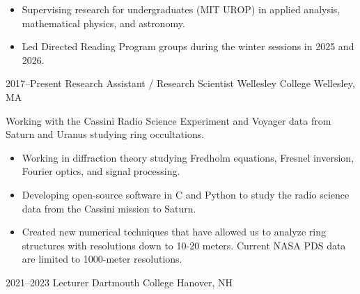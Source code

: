 \documentclass[a4paper,sans]{moderncv}
\begin{document}
{\begin{itemize}
\begin{itemize}
                                    of bifurcation methods.
                                \item
                                    Fast evaluation of the Jones polynomial.
                                \item
                                    Fast evaluation of Khovanov homology.
                            \end{itemize}
                        \item
                            Supervising research for undergraduates
                            (MIT UROP) in applied analysis,
                            mathematical physics, and astronomy.
                        \item
                            Led Directed Reading Program groups during
                            the winter sessions in 2025 and 2026.
                    \end{itemize}
                }
                \cventry%
                {2017--Present}
                {Research Assistant / Research Scientist}
                {Wellesley College}
                {Wellesley, MA}
                {}
                {%
                    Working with the Cassini Radio Science
                    Experiment and Voyager data from Saturn and Uranus
                    studying ring occultations.
                    \begin{itemize}
                        \item
                            Working in diffraction theory studying Fredholm
                            equations, Fresnel inversion, Fourier optics,
                            and signal processing.
                         \item
                            Developing open-source software in C and Python to
                            study the radio science data from the
                            Cassini mission to Saturn.
                         \item
                            Created new numerical techniques that have allowed
                            us to analyze ring structures with resolutions
                            down to 10-20 meters. Current NASA PDS data are
                            limited to 1000-meter resolutions.
                     \end{itemize}
                 }
        \cventry%
            {2021--2023}
            {Lecturer}
            {Dartmouth College}
            {Hanover, NH}
\end{document}
